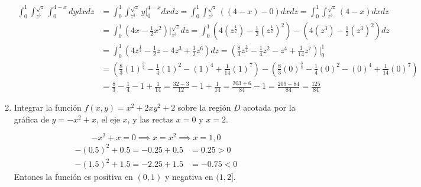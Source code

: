 \documentclass{article}
\begin{document}
\begin{enumerate}
{        \begin{align*}
            \int_{0}^{1} \int_{z^3}^{\sqrt{z}} \int_{0}^{4-x} dydxdz
                &= \int_{0}^{1} \int_{z^3}^{\sqrt{z}} y \Big|_{0}^{4-x} dxdz
                    = \int_{0}^{1} \int_{z^3}^{\sqrt{z}} ((4-x)-0) dxdz
                    = \int_{0}^{1} \int_{z^3}^{\sqrt{z}} (4-x) dxdz\\
                &= \int_{0}^{1} (4x - \frac{1}{2}x^2) \Big |_{z^3}^{\sqrt{z}} dz
                    = \int_{0}^{1} (4(z^{\frac{1}{2}}) - \frac{1}{2}(z^{\frac{1}{2}})^2) - (4(z^3)
                    - \frac{1}{2}(z^3)^2) dz\\
                &= \int_{0}^{1} (4z^{\frac{1}{2}} - \frac{1}{2}z - 4z^3 + \frac{1}{2}z^6) dz
                    = (\frac{8}{3}z^{\frac{3}{2}} - \frac{1}{4}z^2 - z^4 + \frac{1}{14}z^7) \Big |_{0}^{1}\\
                &= (\frac{8}{3}(1)^{\frac{3}{2}} - \frac{1}{4}(1)^2 - (1)^4 + \frac{1}{14}(1)^7)
                    - (\frac{8}{3}(0)^{\frac{3}{2}} - \frac{1}{4}(0)^2 - (0)^4 + \frac{1}{14}(0)^7)\\
                &= \frac{8}{3} - \frac{1}{4} - 1 + \frac{1}{14} = \frac{32-3}{12} - 1 + \frac{1}{14}
                    = \frac{203+6}{84} - 1 = \frac{209 - 84}{84} = \frac{125}{84}
        \end{align*}
    }

    \item {
        Integrar la función $f(x,y) = x^2 + 2xy^2 + 2$ sobre la región $D$
        acotada por la gráfica de $y = -x^2 + x$, el eje $x$, y las rectas
        $x = 0$ y $x = 2$.

        \color{azul}
        \[
            -x^2 + x = 0 \implies x = x^2 \implies x = 1, 0
        \]
        \begin{align*}
            -(0.5)^2 + 0.5 = -0.25 + 0.5 & = 0.25 > 0 \\
            -(1.5)^2 + 1.5 = -2.25 + 1.5 & = -0.75 < 0
        \end{align*}
        Entones la función es positiva en $(0, 1)$ y negativa en $(1, 2]$.

}
\end{enumerate}
\end{document}
